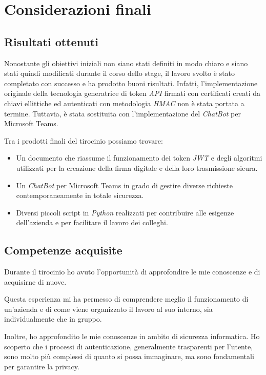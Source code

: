 \chapter{Considerazioni finali}
\label{cap:conclusioni}

\section{Risultati ottenuti}

Nonostante gli obiettivi iniziali non siano stati definiti in modo chiaro e siano stati quindi modificati durante il corso dello stage, il lavoro svolto è stato completato con successo e ha prodotto buoni risultati.
Infatti, l'implementazione originale della tecnologia generatrice di token \emph{API} firmati con certificati creati da chiavi ellittiche ed autenticati con metodologia \emph{HMAC} non è stata portata a termine.
Tuttavia, è stata sostituita con l'implementazione del \emph{ChatBot} per Microsoft Teams.

\noindent Tra i prodotti finali del tirocinio possiamo trovare:
\begin{itemize}
	\item Un documento che riassume il funzionamento dei token \emph{JWT} e degli algoritmi utilizzati per la creazione della firma digitale e della loro trasmissione sicura.
	\item Un \emph{ChatBot} per Microsoft Teams in grado di gestire diverse richieste contemporaneamente in totale sicurezza.
	\item Diversi piccoli script in \emph{Python} realizzati per contribuire alle esigenze dell'azienda e per facilitare il lavoro dei colleghi.
\end{itemize}

\section{Competenze acquisite}

Durante il tirocinio ho avuto l'opportunità di approfondire le mie conoscenze e di acquisirne di nuove.

Questa esperienza mi ha permesso di comprendere meglio il funzionamento di un'azienda e di come viene organizzato il lavoro al suo interno, sia individualmente che in gruppo.

Inoltre, ho approfondito le mie conoscenze in ambito di sicurezza informatica.
Ho scoperto che i processi di autenticazione, generalmente trasparenti per l'utente, sono molto più complessi di quanto si possa immaginare, ma sono fondamentali per garantire la privacy.

